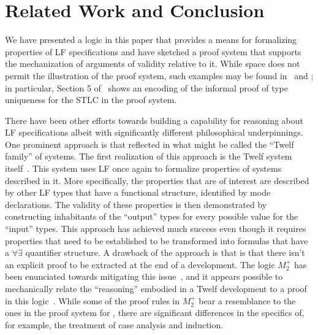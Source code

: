 \section{Related Work and Conclusion}\label{sec:conclusion}

We have presented a logic in this paper that provides
a means for formalizing properties of LF specifications and have
sketched a proof system that supports the mechanization of arguments
of validity relative to it. 
%
While space does not permit the illustration of the proof
system, such examples may be found in~\cite{nadathur21arxiv} and
\cite{southern21phd}; in particular, Section 5
of~\cite{nadathur21arxiv} shows an encoding of the informal proof of
type uniqueness for the STLC in the proof system.
%

There have been other efforts towards building a capability for
reasoning about LF specifications albeit with significantly different
philosophical underpinnings. 
%
One prominent approach is that reflected in what might be called the
``Twelf family'' of systems.
%
The first realization of this approach is the Twelf system
itself~\cite{pfenning99cade}. 
%
This system uses LF once again to formalize properties of systems
described in it.
%
More specifically, the properties that are of interest are described
by other LF types that have a functional structure, identified by mode
declarations. 
%
The validity of these properties is then demonstrated by constructing
inhabitants of the ``output'' types for every possible value for the
``input'' types.
%
This approach has achieved much success even though it requires
properties that need to be established to be transformed into formulas
that have a $\forall\exists$ quantifier structure.
%
A drawback of the approach is that is that there isn't an
explicit proof to be extracted at the end of a development.
%
The logic $M_2^+$ has been enunciated towards mitigating this
issue~\cite{schurmann00phd}, and it appears possible to mechanically 
relate the ``reasoning'' embodied in a Twelf development to a proof in
this logic~\cite{wang13lfmtp}.
%
While some of the proof rules in $M_2^+$ bear a resemblance to the
ones in the proof system for \logic, there are significant differences
in the specifics of, for example, the treatment of case analysis and
induction.


